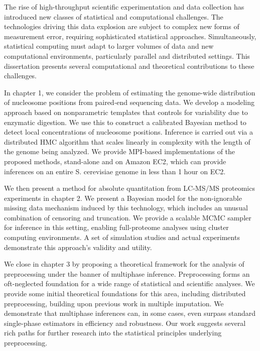 
The rise of high-throughput scientific experimentation and data collection has introduced new classes of statistical and computational challenges.
The technologies driving this data explosion are subject to complex new forms of measurement error, requiring sophisticated statistical approaches.
Simultaneously, statistical computing must adapt to larger volumes of data and new computational environments, particularly parallel and distributed settings.
This dissertation presents several computational and theoretical contributions to these challenges.

In chapter 1, we consider the problem of estimating the genome-wide distribution of nucleosome positions from paired-end sequencing data.
We develop a modeling approach based on nonparametric templates that controls for variability due to enzymatic digestion.
We use this to construct a calibrated Bayesian method to detect local concentrations of nucleosome positions.
Inference is carried out via a distributed HMC algorithm that scales linearly in complexity with the length of the genome being analyzed.
We provide MPI-based implementations of the proposed methods, stand-alone and on Amazon EC2, which can provide inferences on an entire S. cerevisiae genome in less than 1 hour on EC2.

We then present a method for absolute quantitation from LC-MS/MS proteomics experiments in chapter 2.
We present a Bayesian model for the non-ignorable missing data mechanism induced by this technology, which includes an unusual combination of censoring and truncation.
We provide a scalable MCMC sampler for inference in this setting, enabling full-proteome analyses using cluster computing environments.
A set of simulation studies and actual experiments demonstrate this approach's validity and utility.

We close in chapter 3 by proposing a theoretical framework for the analysis of preprocessing under the banner of multiphase inference.
Preprocessing forms an oft-neglected foundation for a wide range of statistical and scientific analyses.
We provide some initial theoretical foundations for this area, including distributed preprocessing, building upon previous work in multiple imputation.
We demonstrate that multiphase inferences can, in some cases, even surpass standard single-phase estimators in efficiency and robustness.
Our work suggests several rich paths for further research into the statistical principles underlying preprocessing.

